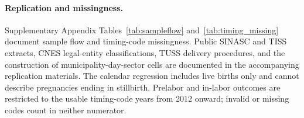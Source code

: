 \paragraph{Replication and missingness.} Supplementary Appendix Tables~\ref{tab:sampleflow} and~\ref{tab:timing_missing} document sample flow and timing-code missingness. Public SINASC and TISS extracts, CNES legal-entity classifications, TUSS delivery procedures, and the construction of municipality-day-sector cells are documented in the accompanying replication materials. The calendar regression includes live births only and cannot describe pregnancies ending in stillbirth. Prelabor and in-labor outcomes are restricted to the usable timing-code years from 2012 onward; invalid or missing codes count in neither numerator.
